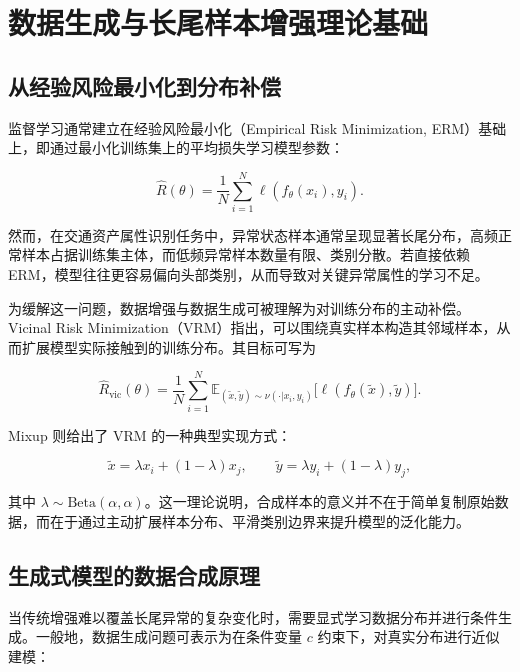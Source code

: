 \section{数据生成与长尾样本增强理论基础}

\subsection{从经验风险最小化到分布补偿}

监督学习通常建立在经验风险最小化（Empirical Risk Minimization, ERM）基础上，即通过最小化训练集上的平均损失学习模型参数：

\begin{equation}
\hat R(\theta)=\frac{1}{N}\sum_{i=1}^{N}\ell(f_{\theta}(x_i),y_i).
\end{equation}

然而，在交通资产属性识别任务中，异常状态样本通常呈现显著长尾分布，高频正常样本占据训练集主体，而低频异常样本数量有限、类别分散。若直接依赖 ERM，模型往往更容易偏向头部类别，从而导致对关键异常属性的学习不足。

为缓解这一问题，数据增强与数据生成可被理解为对训练分布的主动补偿。Vicinal Risk Minimization（VRM）指出，可以围绕真实样本构造其邻域样本，从而扩展模型实际接触到的训练分布\cite{chapelle2001vrm}。其目标可写为

\begin{equation}
\hat R_{\text{vic}}(\theta)=\frac{1}{N}\sum_{i=1}^{N}\mathbb{E}_{(\tilde x,\tilde y)\sim \nu(\cdot|x_i,y_i)}\big[\ell(f_{\theta}(\tilde x),\tilde y)\big].
\end{equation}

Mixup 则给出了 VRM 的一种典型实现方式\cite{zhang2018mixup}：

\begin{equation}
\tilde x=\lambda x_i+(1-\lambda)x_j,\qquad
\tilde y=\lambda y_i+(1-\lambda)y_j,
\end{equation}

其中 $\lambda\sim\mathrm{Beta}(\alpha,\alpha)$。这一理论说明，合成样本的意义并不在于简单复制原始数据，而在于通过主动扩展样本分布、平滑类别边界来提升模型的泛化能力。

\subsection{生成式模型的数据合成原理}

当传统增强难以覆盖长尾异常的复杂变化时，需要显式学习数据分布并进行条件生成。一般地，数据生成问题可表示为在条件变量 $c$ 约束下，对真实分布进行近似建模：

